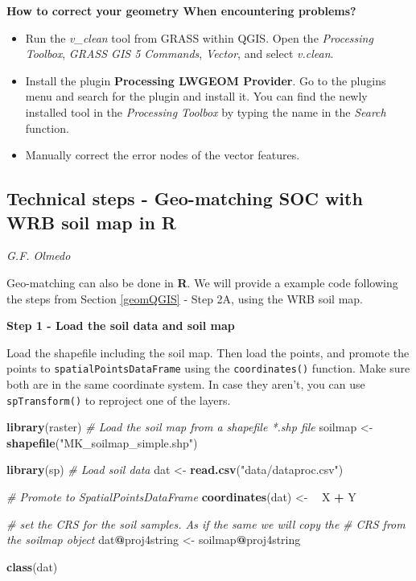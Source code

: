 \documentclass[10pt,b5paper,]{book}
\newenvironment{Shaded}{\begin{snugshade}}{\end{snugshade}}
\newcommand{\CommentTok}[1]{\textcolor[rgb]{0.56,0.35,0.01}{\textit{#1}}}
\newcommand{\ErrorTok}[1]{\textcolor[rgb]{0.64,0.00,0.00}{\textbf{#1}}}
\newcommand{\KeywordTok}[1]{\textcolor[rgb]{0.13,0.29,0.53}{\textbf{#1}}}
\newcommand{\NormalTok}[1]{#1}
\newcommand{\OperatorTok}[1]{\textcolor[rgb]{0.81,0.36,0.00}{\textbf{#1}}}
\newcommand{\StringTok}[1]{\textcolor[rgb]{0.31,0.60,0.02}{#1}}
\providecommand{\tightlist}{%
  \setlength{\itemsep}{0pt}\setlength{\parskip}{0pt}}
\theoremstyle{definition}
\theoremstyle{definition}
\theoremstyle{definition}
\theoremstyle{remark}
\begin{document}
\textbf{How to correct your geometry When encountering problems?}

\begin{itemize}
\tightlist
\item
  Run the \emph{v\_clean} tool from GRASS within QGIS. Open the
  \emph{Processing Toolbox}, \emph{GRASS GIS 5 Commands}, \emph{Vector},
  and select \emph{v.clean}.
\item
  Install the plugin \textbf{Processing LWGEOM Provider}. Go to the
  plugins menu and search for the plugin and install it. You can find
  the newly installed tool in the \emph{Processing Toolbox} by typing
  the name in the \emph{Search} function.
\item
  Manually correct the error nodes of the vector features.
\end{itemize}

\hypertarget{technical-steps---geo-matching-soc-with-wrb-soil-map-in-r}{%
\subsection{Technical steps - Geo-matching SOC with WRB soil map in
R}\label{technical-steps---geo-matching-soc-with-wrb-soil-map-in-r}}

\emph{G.F. Olmedo}

Geo-matching can also be done in \textbf{R}. We will provide a example
code following the steps from Section \ref{geomQGIS} - Step 2A, using
the WRB soil map.

\textbf{Step 1 - Load the soil data and soil map}

Load the shapefile including the soil map. Then load the points, and
promote the points to \texttt{spatialPointsDataFrame} using the
\texttt{coordinates()} function. Make sure both are in the same
coordinate system. In case they aren't, you can use
\texttt{spTransform()} to reproject one of the layers.

\begin{Shaded}
\begin{Highlighting}[]
\KeywordTok{library}\NormalTok{(raster)}
\CommentTok{# Load the soil map from a shapefile *.shp file}
\NormalTok{soilmap <-}\StringTok{ }\KeywordTok{shapefile}\NormalTok{(}\StringTok{"MK_soilmap_simple.shp"}\NormalTok{)}

\KeywordTok{library}\NormalTok{(sp)}
\CommentTok{# Load soil data}
\NormalTok{dat <-}\StringTok{ }\KeywordTok{read.csv}\NormalTok{(}\StringTok{"data/dataproc.csv"}\NormalTok{)}

\CommentTok{# Promote to SpatialPointsDataFrame}
\KeywordTok{coordinates}\NormalTok{(dat) <-}\StringTok{ }\ErrorTok{~}\StringTok{ }\NormalTok{X }\OperatorTok{+}\StringTok{ }\NormalTok{Y}

\CommentTok{# set the CRS for the soil samples. As if the same we will copy the }
\CommentTok{# CRS from the soilmap object}
\NormalTok{dat}\OperatorTok{@}\NormalTok{proj4string <-}\StringTok{ }\NormalTok{soilmap}\OperatorTok{@}\NormalTok{proj4string}

\KeywordTok{class}\NormalTok{(dat)}
\end{Highlighting}
\end{Shaded}
\end{document}
